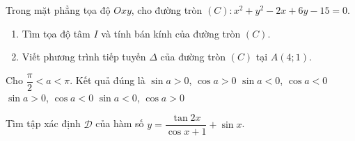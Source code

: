 \begin{bt}%
	Trong mặt phẳng tọa độ $Oxy$, cho đường tròn $(C) \colon x^2+y^2-2x+6y-15=0$. 
	\begin{enumerate}
		\item Tìm tọa độ tâm $I$  và tính bán kính của đường tròn $(C)$.
		\item Viết phương trình tiếp tuyến $\Delta$ của đường tròn $(C)$ tại $A(4;1)$. 
	\end{enumerate}
\end{bt}

\begin{ex}%
	Cho $\dfrac{\pi}{2}<a<\pi$. Kết quả  đúng là
	 \choice
		{$\sin a>0$,  $\cos a>0$}
		 {$\sin a<0$, $\cos a<0$}
		 {\True $\sin a>0$, $\cos a<0$}
		{$\sin a<0$, $\cos a>0$} 
\end{ex}

\begin{bt}%
	 Tìm tập xác định $\mathscr{D}$ của hàm số
	$y=\dfrac{\tan 2x}{\cos x+1}+\sin x$. 
\end{bt}

